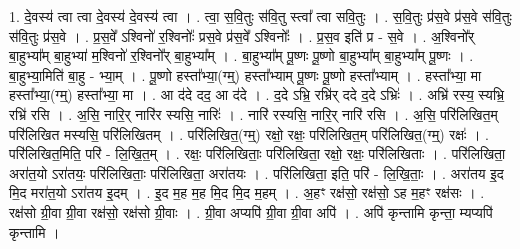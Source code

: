 \documentclass[17pt]{extarticle}
\begin{document}
1. दे॒वस्य॑ त्वा त्वा दे॒वस्य॑ दे॒वस्य॑ त्वा । . त्वा॒ स॒वि॒तुः स॑वि॒तु स्त्वा᳚ त्वा सवि॒तुः । . स॒वि॒तुः प्र॑स॒वे प्र॑स॒वे स॑वि॒तुः स॑वि॒तुः प्र॑स॒वे । . प्र॒स॒वे᳚ ऽश्विनो॑ र॒श्विनोः᳚ प्रस॒वे प्र॑स॒वे᳚ ऽश्विनोः᳚ । . प्र॒स॒व इति॑ प्र - स॒वे । . अ॒श्विनो᳚र् बा॒हुभ्या᳚म् बा॒हुभ्या॑ म॒श्विनो॑ र॒श्विनो᳚र् बा॒हुभ्या᳚म् । . बा॒हुभ्या᳚म् पू॒ष्णः पू॒ष्णो बा॒हुभ्या᳚म् बा॒हुभ्या᳚म् पू॒ष्णः । . बा॒हुभ्या॒मिति॑ बा॒हु - भ्या॒म् । . पू॒ष्णो हस्ता᳚भ्या॒(ग्म्॒) हस्ता᳚भ्याम् पू॒ष्णः पू॒ष्णो हस्ता᳚भ्याम् । . हस्ता᳚भ्या॒ मा हस्ता᳚भ्या॒(ग्म्॒) हस्ता᳚भ्या॒ मा । . आ द॑दे दद॒ आ द॑दे । . द॒दे ऽभ्रि॒ रभ्रि॑र् ददे द॒दे ऽभ्रिः॑ । . अभ्रि॑ रस्य॒ स्यभ्रि॒ रभ्रि॑ रसि । . अ॒सि॒ नारि॒र् नारि॑र स्यसि॒ नारिः॑ । . नारि॑ रस्यसि॒ नारि॒र् नारि॑ रसि । . अ॒सि॒ परि॑लिखित॒म् परि॑लिखित मस्यसि॒ परि॑लिखितम् । . परि॑लिखित॒(ग्म्॒) रक्षो॒ रक्षः॒ परि॑लिखित॒म् परि॑लिखित॒(ग्म्॒) रक्षः॑ । . परि॑लिखित॒मिति॒ परि॑ - लि॒खि॒त॒म् । . रक्षः॒ परि॑लिखिताः॒ परि॑लिखिता॒ रक्षो॒ रक्षः॒ परि॑लिखिताः । . परि॑लिखिता॒ अरा॑त॒यो ऽरा॑तयः॒ परि॑लिखिताः॒ परि॑लिखिता॒ अरा॑तयः । . परि॑लिखिता॒ इति॒ परि॑ - लि॒खि॒ताः॒ । . अरा॑तय इ॒द मि॒द मरा॑त॒यो ऽरा॑तय इ॒दम् । . इ॒द म॒ह म॒ह मि॒द मि॒द म॒हम् । . अ॒हꣳ रक्ष॑सो॒ रक्ष॑सो॒ ऽह म॒हꣳ रक्ष॑सः । . रक्ष॑सो ग्री॒वा ग्री॒वा रक्ष॑सो॒ रक्ष॑सो ग्री॒वाः । . ग्री॒वा अप्यपि॑ ग्री॒वा ग्री॒वा अपि॑ । . अपि॑ कृन्तामि कृन्ता॒ म्यप्यपि॑ कृन्तामि । \newline
\end{document}
